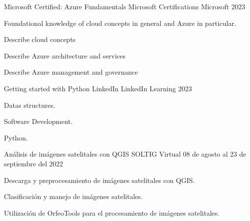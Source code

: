

\begin{cventries}


  \cventry
  {Microsoft Certified: Azure Fundamentals} %
    {Microsoft Certifications} %
    {Microsoft} %
    {2023} %
    {
      \begin{cvitems} %
        \item Foundational knowledge of cloud concepts in general and Azure in
              particular.
        \item Describe cloud concepts
        \item Describe Azure architecture and services
        \item Describe Azure management and governance
      \end{cvitems}
    }
  \cventry
  {Getting started with Python} %
    {LinkedIn} %
    {LinkedIn Learning} %
    {2023} %
    {
      \begin{cvitems} %
        \item Datas structures.
        \item Software Development.
        \item Python.
      \end{cvitems}
    }
  \cventry
  {Análisis de imágenes satelitales con QGIS} %
    {SOLTIG} %
    {Virtual} %
    {08 de agosto al 23 de septiembre del 2022} %
    {
      \begin{cvitems} %
        \item Descarga y preprocesamiento de imágenes satelitales con QGIS.
        \item Clasificación y manejo de imágenes satelitales.
        \item Utilización de OrfeoTools para el procesamiento de imágenes satelitales.

\end{cvitems}}
\end{cventries}

